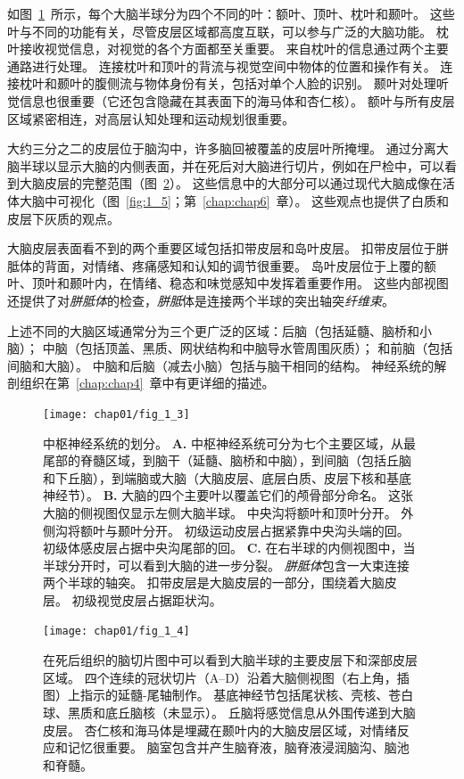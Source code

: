 \begin{proposition}[中枢神经系统的解剖学组织]
	\quad \quad 如图~\ref{fig:1_3}~所示，每个大脑半球分为四个不同的叶：额叶、顶叶、枕叶和颞叶。
	这些叶与不同的功能有关，尽管皮层区域都高度互联，可以参与广泛的大脑功能。
	枕叶接收视觉信息，对视觉的各个方面都至关重要。
	来自枕叶的信息通过两个主要通路进行处理。
	连接枕叶和顶叶的背流与视觉空间中物体的位置和操作有关。
	连接枕叶和颞叶的腹侧流与物体身份有关，包括对单个人脸的识别。
	颞叶对处理听觉信息也很重要（它还包含隐藏在其表面下的海马体和杏仁核）。
	额叶与所有皮层区域紧密相连，对高层认知处理和运动规划很重要。
	
	\quad \quad 大约三分之二的皮层位于脑沟中，许多脑回被覆盖的皮层叶所掩埋。
	通过分离大脑半球以显示大脑的内侧表面，并在死后对大脑进行切片，例如在尸检中，可以看到大脑皮层的完整范围（图~\ref{fig:1_4}）。
	这些信息中的大部分可以通过现代大脑成像在活体大脑中可视化（图~\ref{fig:1_5}；第~\ref{chap:chap6}~章）。
	这些观点也提供了白质和皮层下灰质的观点。
	
	\quad \quad 大脑皮层表面看不到的两个重要区域包括扣带皮层和岛叶皮层。
	扣带皮层位于胼胝体的背面，对情绪、疼痛感知和认知的调节很重要。
	岛叶皮层位于上覆的额叶、顶叶和颞叶内，在情绪、稳态和味觉感知中发挥着重要作用。
	这些内部视图还提供了对\textit{胼胝体}的检查，\textit{胼胝}体是连接两个半球的突出轴突\textit{纤维束}。
	
	上述不同的大脑区域通常分为三个更广泛的区域：后脑（包括延髓、脑桥和小脑）；
	中脑（包括顶盖、黑质、网状结构和中脑导水管周围灰质）；
	和前脑（包括间脑和大脑）。
	中脑和后脑（减去小脑）包括与脑干相同的结构。
	神经系统的解剖组织在第~\ref{chap:chap4}~章中有更详细的描述。
		
\end{proposition}


\begin{figure}[htbp]
	\centering
	\texttt{[image: chap01/fig\_1\_3]}
	\caption{中枢神经系统的划分。
		\textbf{A.} 中枢神经系统可分为七个主要区域，从最尾部的脊髓区域，到脑干（延髓、脑桥和中脑），到间脑（包括丘脑和下丘脑），到端脑或大脑（大脑皮层、底层白质、皮层下核和基底神经节）。
		\textbf{B.} 大脑的四个主要叶以覆盖它们的颅骨部分命名。
		这张大脑的侧视图仅显示左侧大脑半球。
		中央沟将额叶和顶叶分开。
		外侧沟将额叶与颞叶分开。
		初级运动皮层占据紧靠中央沟头端的回。
		初级体感皮层占据中央沟尾部的回。
		\textbf{C.} 在右半球的内侧视图中，当半球分开时，可以看到大脑的进一步分裂。
		\textit{胼胝体}包含一大束连接两个半球的轴突。
		扣带皮层是大脑皮层的一部分，围绕着大脑皮层。
		初级视觉皮层占据距状沟。}
	\label{fig:1_3}
\end{figure}


\begin{figure}[htbp]
	\centering
	\texttt{[image: chap01/fig\_1\_4]}
	\caption{在死后组织的脑切片图中可以看到大脑半球的主要皮层下和深部皮层区域。
		四个连续的冠状切片（A–D）沿着大脑侧视图（右上角，插图）上指示的延髓-尾轴制作。
		基底神经节包括尾状核、壳核、苍白球、黑质和底丘脑核（未显示）。
		丘脑将感觉信息从外围传递到大脑皮层。
		杏仁核和海马体是埋藏在颞叶内的大脑皮层区域，对情绪反应和记忆很重要。
		脑室包含并产生脑脊液，脑脊液浸润脑沟、脑池和脊髓\cite{nieuwenhuys2007human}。}
	\label{fig:1_4}
\end{figure}


